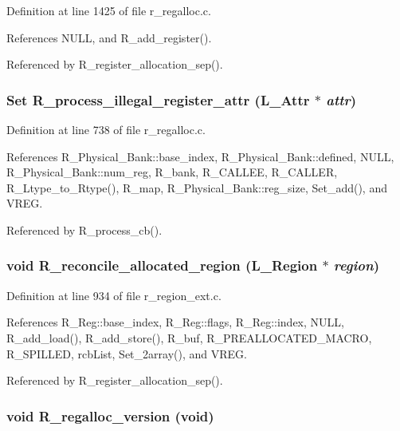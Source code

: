 Definition at line 1425 of file r\_\-regalloc.c.

References NULL, and R\_\-add\_\-register().

Referenced by R\_\-register\_\-allocation\_\-sep().
\subsubsection{\setlength{\rightskip}{0pt plus 5cm}\bf{Set} R\_\-process\_\-illegal\_\-register\_\-attr (L\_\-Attr $\ast$ {\em attr})}\label{r__regproto_8h_8590847b25b2f501832ac37911a7e984}




Definition at line 738 of file r\_\-regalloc.c.

References R\_\-Physical\_\-Bank::base\_\-index, R\_\-Physical\_\-Bank::defined, NULL, R\_\-Physical\_\-Bank::num\_\-reg, R\_\-bank, R\_\-CALLEE, R\_\-CALLER, R\_\-Ltype\_\-to\_\-Rtype(), R\_\-map, R\_\-Physical\_\-Bank::reg\_\-size, Set\_\-add(), and VREG.

Referenced by R\_\-process\_\-cb().
\subsubsection{\setlength{\rightskip}{0pt plus 5cm}void R\_\-reconcile\_\-allocated\_\-region (L\_\-Region $\ast$ {\em region})}\label{r__regproto_8h_1154fdec77ea05ee168b3ae6d7f7b843}




Definition at line 934 of file r\_\-region\_\-ext.c.

References R\_\-Reg::base\_\-index, R\_\-Reg::flags, R\_\-Reg::index, NULL, R\_\-add\_\-load(), R\_\-add\_\-store(), R\_\-buf, R\_\-PREALLOCATED\_\-MACRO, R\_\-SPILLED, rcb\-List, Set\_\-2array(), and VREG.

Referenced by R\_\-register\_\-allocation\_\-sep().
\subsubsection{\setlength{\rightskip}{0pt plus 5cm}void R\_\-regalloc\_\-version (void)}\label{r__regproto_8h_e0605262f9cb355730d650fdb72860a5}




